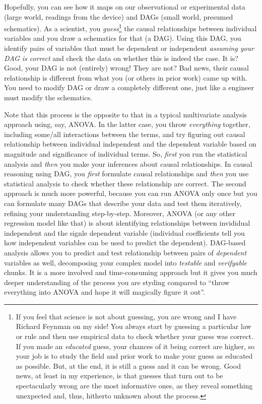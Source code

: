 \documentclass[
]{book}
\begin{document}
Hopefully, you can see how it maps on our observational or experimental data (large world, readings from the device) and DAGs (small world, presumed schematics). As a scientist, you \emph{guess}\footnote{If you feel that science is not about guessing, you are wrong and I have Richard Feynman on my side! You always start by guessing a particular law or rule and then use empirical data to check whether your guess was correct. If you made an \emph{educated} guess, your chances of it being correct are higher, so your job is to study the field and prior work to make your guess as educated as possible. But, at the end, it is still a guess and it can be wrong. Good news, at least in my experience, is that guesses that turn out to be spectacularly wrong are the most informative ones, as they reveal something unexpected and, thus, hitherto unknown about the process.} the causal relationships between individual variables and you draw a schematics for that (a DAG). Using this DAG, you identify pairs of variables that must be dependent or independent \emph{assuming your DAG is correct} and check the data on whether this is indeed the case. It is? Good, your DAG is not (entirely) wrong! They are not? Bad news, their causal relationship is different from what you (or others in prior work) came up with. You need to modify DAG or draw a completely different one, just like a engineer must modify the schematics.

Note that this process is the opposite to that in a typical multivariate analysis approach using, say, ANOVA. In the latter case, you throw \emph{everything} together, including some/all interactions between the terms, and try figuring out causal relationship between individual independent and the dependent variable based on magnitude and significance of individual terms. So, \emph{first} you run the statistical analysis and \emph{then} you make your inferences about causal relationships. In causal reasoning using DAG, you \emph{first} formulate causal relationships and \emph{then} you use statistical analysis to check whether these relationship are correct. The second approach is much more powerful, because you can run ANOVA only once but you can formulate many DAGs that describe your data and test them iteratively, refining your understanding step-by-step. Moreover, ANOVA (or any other regression model like that) is about identifying relationships between invididual independent and the signle dependent variable (individual coefficients tell you how independent variables can be used to predict the dependent). DAG-based analysis allows you to predict and test relationship between pairs of \emph{dependent} variables as well, decomposing your complex model into \emph{testable} and \emph{verifyable} chunks. It is a more involved and time-consuming approach but it gives you much deeper understanding of the process you are styding compared to ``throw everything into ANOVA and hope it will magically figure it out''.
\end{document}
